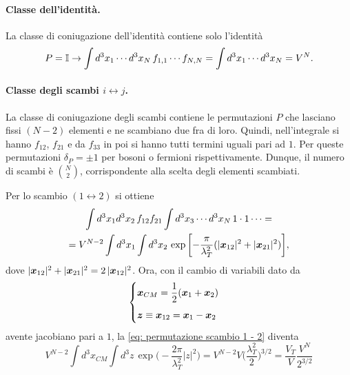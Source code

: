 \paragraph{Classe dell'identità.} La classe di coniugazione dell'identità contiene solo l'identità
\begin{equation}
    P = \mathbb{I} \to \int d^3x_1\cdots d^3x_N\,f_{1,1}\cdots f_{N,N} = \int d^3x_1\cdots d^3x_N = V^N.
\end{equation}
\paragraph{Classe degli scambi $i\leftrightarrow j$.} La classe di coniugazione degli scambi contiene le permutazioni $P$ che lasciano fissi $(N-2)$ elementi e
ne scambiano due fra di loro. Quindi, nell'integrale si hanno $f_{12}$, $f_{21}$ e da $f_{33}$ in poi si hanno tutti termini uguali pari ad $1$. Per queste permutazioni $\delta_P = \pm 1$ per bosoni o fermioni rispettivamente. Dunque, il numero di scambi è $\binom{N}{2}$, corrispondente alla scelta degli elementi scambiati. 
\begin{ex}
    Per lo scambio $(1 \leftrightarrow 2)$ si ottiene
    \begin{multline}
    \label{eq: permutazione scambio 1 - 2}
        \int d^3 x_1 d^3 x_2\,f_{12} f_{21} \int d^3 x_3 \cdots d^3 x_N\,1 \cdot 1 \cdots =\\
        = V^{N-2} \int d^3 x_1 \int d^3 x_2\,\exp\bigg[{- \frac{\pi}{\lambda_T^2} (|\bm{x}_{12}|^2 + |\bm{x}_{21}|^2)}\bigg],
    \end{multline}
    dove $|\bm{x}_{12}|^2 + |\bm{x}_{21}|^2
        = 2\, |\bm{x}_{12}|^2$. Ora, con il cambio di variabili dato da
    \begin{equation}
        \begin{cases}
            \bm{x}_{CM} = \dfrac{1}{2}(\bm{x}_1 + \bm{x}_2) \\[2ex]
        \bm{z} \equiv \bm{x}_{12} = \bm{x}_1 - \bm{x}_2
        \end{cases}
    \end{equation}
    avente jacobiano pari a $1$, la \eqref{eq: permutazione scambio 1 - 2} diventa
    \begin{equation}
        V^{N-2} \int d^3 x_{CM} \int d^3 z \, \exp{\bigg(-\frac{2\pi}{\lambda_T^2}|z|^2\bigg)} = V^{N-2} V \bigg( \frac{\lambda_T^2}{2} \bigg)^{3/2} =  \frac{V_T}{V} \frac{V^N}{2^{3/2}}
    \end{equation}
\end{ex}

